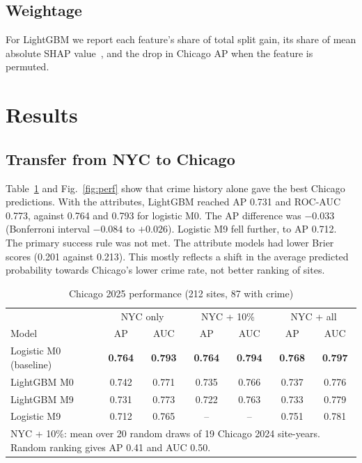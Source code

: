 \documentclass[conference]{IEEEtran}
\begin{document}
\subsection{Weightage}
For LightGBM we report each feature's share of total split gain, its share of mean absolute SHAP
value~\cite{lundberg2017}, and the drop in Chicago AP when the feature is permuted.

\section{Results}
\subsection{Transfer from NYC to Chicago}
Table~\ref{tab:chicago} and Fig.~\ref{fig:perf} show that crime history alone gave the best Chicago predictions. With
the attributes, LightGBM reached AP 0.731 and ROC-AUC 0.773, against 0.764 and 0.793 for logistic M0. The AP
difference was $-0.033$ (Bonferroni interval $-0.084$ to $+0.026$). Logistic M9 fell further, to AP 0.712. The
primary success rule was not met. The attribute models had lower Brier scores (0.201 against 0.213). This mostly
reflects a shift in the average predicted probability towards Chicago's lower crime rate, not better ranking of sites.

\begin{table}[t]
\caption{Chicago 2025 performance (212 sites, 87 with crime)}
\label{tab:chicago}
\centering
\setlength{\tabcolsep}{4pt}
\begin{tabular}{lcccccc}
\toprule
& \multicolumn{2}{c}{NYC only} & \multicolumn{2}{c}{NYC + 10\%} & \multicolumn{2}{c}{NYC + all} \\
Model & AP & AUC & AP & AUC & AP & AUC \\
\midrule
Logistic M0 (baseline) & \textbf{0.764} & \textbf{0.793} & \textbf{0.764} & \textbf{0.794} & \textbf{0.768} & \textbf{0.797} \\
LightGBM M0 & 0.742 & 0.771 & 0.735 & 0.766 & 0.737 & 0.776 \\
LightGBM M9 & 0.731 & 0.773 & 0.722 & 0.763 & 0.733 & 0.779 \\
Logistic M9 & 0.712 & 0.765 & -- & -- & 0.751 & 0.781 \\
\bottomrule
\multicolumn{7}{p{8.2cm}}{\footnotesize NYC + 10\%: mean over 20 random draws of 19 Chicago 2024 site-years.
Random ranking gives AP 0.41 and AUC 0.50.}
\end{tabular}
\end{table}
\end{document}
